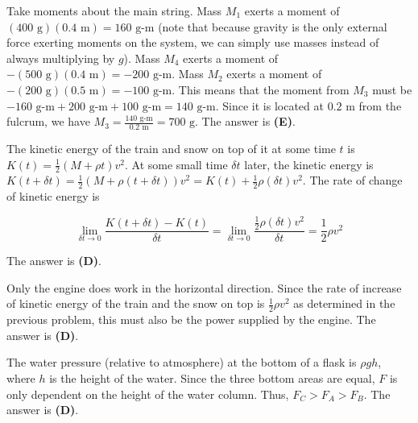 \documentclass[12pt]{article}
\begin{document}
\vspace{2 \baselineskip}



Take moments about the main string. Mass $M_1$ exerts a moment of $(400 \text{ g}) (0.4 \text{ m}) = 160 \text{ g-m}$ (note that because gravity is the only external force exerting moments on the system, we can simply use masses instead of always multiplying by $g$). Mass $M_4$ exerts a moment of $-(500 \text{ g}) (0.4 \text{ m}) = -200 \text{ g-m}$. Mass $M_2$ exerts a moment of $-(200 \text{ g}) (0.5 \text{ m}) = -100 \text{ g-m}$. This means that the moment from $M_3$ must be $-160 \text{ g-m} + 200 \text{ g-m} + 100 \text{ g-m} = 140 \text{ g-m}$. Since it is located at $0.2 \text{ m}$ from the fulcrum, we have $M_3 = \frac{140 \text{ g-m}}{0.2 \text{ m}} = 700 \text{ g}$. The answer is \textbf{(E)}.


\vspace{2 \baselineskip}



The kinetic energy of the train and snow on top of it at some time $t$ is $K (t) = \frac{1}{2} (M + \rho t) v^2$. At some small time $\delta t$ later, the kinetic energy is $K (t + \delta t) = \frac{1}{2} (M + \rho (t + \delta t)) v^2 = K (t) + \frac{1}{2} \rho (\delta t) v^2$. The rate of change of kinetic energy is

$$\lim_{\delta t \to 0} \frac{K (t + \delta t) - K (t)}{\delta t} = \lim_{\delta t \to 0} \frac{\frac{1}{2} \rho (\delta t) v^2}{\delta t} = \frac{1}{2} \rho v^2$$

The answer is \textbf{(D)}.


\vspace{2 \baselineskip}



Only the engine does work in the horizontal direction. Since the rate of increase of kinetic energy of the train and the snow on top is $\frac{1}{2} \rho v^2$ as determined in the previous problem, this must also be the power supplied by the engine. The answer is \textbf{(D)}.


\vspace{2 \baselineskip}



The water pressure (relative to atmosphere) at the bottom of a flask is $\rho g h$, where $h$ is the height of the water. Since the three bottom areas are equal, $F$ is only dependent on the height of the water column. Thus, $F_C > F_A > F_B$. The answer is \textbf{(D)}.
\end{document}
